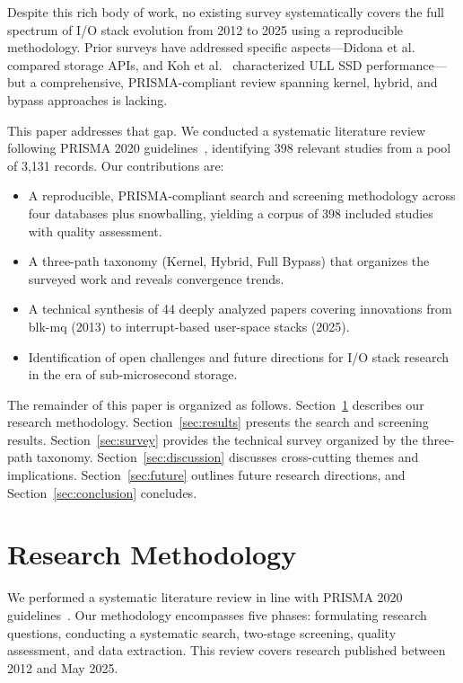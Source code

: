 \documentclass[conference]{IEEEtran}
\begin{document}
Despite this rich body of work, no existing survey systematically covers the full spectrum of I/O stack evolution from 2012 to 2025 using a reproducible methodology. Prior surveys have addressed specific aspects---Didona et al.~\cite{didona2022understanding} compared storage APIs, and Koh et al.~\cite{koh2018exploring} characterized ULL SSD performance---but a comprehensive, PRISMA-compliant review spanning kernel, hybrid, and bypass approaches is lacking.

This paper addresses that gap. We conducted a systematic literature review following PRISMA 2020 guidelines~\cite{page2021prisma}, identifying 398 relevant studies from a pool of 3{,}131 records. Our contributions are:
\begin{itemize}
\item A reproducible, PRISMA-compliant search and screening methodology across four databases plus snowballing, yielding a corpus of 398 included studies with quality assessment.
\item A three-path taxonomy (Kernel, Hybrid, Full Bypass) that organizes the surveyed work and reveals convergence trends.
\item A technical synthesis of 44 deeply analyzed papers covering innovations from blk-mq (2013) to interrupt-based user-space stacks (2025).
\item Identification of open challenges and future directions for I/O stack research in the era of sub-microsecond storage.
\end{itemize}

The remainder of this paper is organized as follows. Section~\ref{sec:method} describes our research methodology. Section~\ref{sec:results} presents the search and screening results. Section~\ref{sec:survey} provides the technical survey organized by the three-path taxonomy. Section~\ref{sec:discussion} discusses cross-cutting themes and implications. Section~\ref{sec:future} outlines future research directions, and Section~\ref{sec:conclusion} concludes.


\section{Research Methodology}
\label{sec:method}

We performed a systematic literature review in line with PRISMA 2020 guidelines~\cite{page2021prisma}. Our methodology encompasses five phases: formulating research questions, conducting a systematic search, two-stage screening, quality assessment, and data extraction. This review covers research published between 2012 and May 2025.
\end{document}
